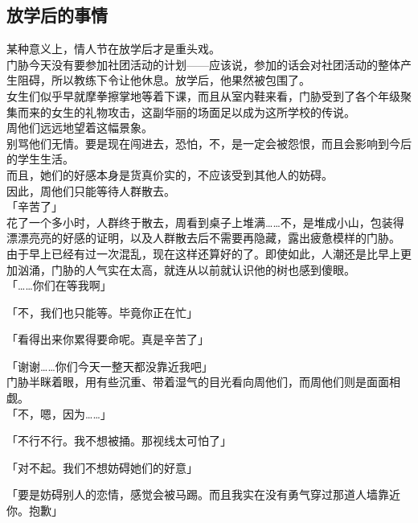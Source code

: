 \subsection{放学后的事情}

某种意义上，情人节在放学后才是重头戏。\\

门胁今天没有要参加社团活动的计划——应该说，参加的话会对社团活动的整体产生阻碍，所以教练下令让他休息。放学后，他果然被包围了。\\

女生们似乎早就摩拳擦掌地等着下课，而且从室内鞋来看，门胁受到了各个年级聚集而来的女生的礼物攻击，这副华丽的场面足以成为这所学校的传说。\\

周他们远远地望着这幅景象。\\

别骂他们无情。要是现在闯进去，恐怕，不，是一定会被怨恨，而且会影响到今后的学生生活。\\

而且，她们的好感本身是货真价实的，不应该受到其他人的妨碍。\\

因此，周他们只能等待人群散去。\\

「辛苦了」\\

花了一个多小时，人群终于散去，周看到桌子上堆满……不，是堆成小山，包装得漂漂亮亮的好感的证明，以及人群散去后不需要再隐藏，露出疲惫模样的门胁。\\

由于早上已经有过一次混乱，现在这样还算好的了。即使如此，人潮还是比早上更加汹涌，门胁的人气实在太高，就连从以前就认识他的树也感到傻眼。\\

「……你们在等我啊」

「不，我们也只能等。毕竟你正在忙」

「看得出来你累得要命呢。真是辛苦了」

「谢谢……你们今天一整天都没靠近我吧」\\

门胁半眯着眼，用有些沉重、带着湿气的目光看向周他们，而周他们则是面面相觑。\\

「不，嗯，因为……」

「不行不行。我不想被捅。那视线太可怕了」

「对不起。我们不想妨碍她们的好意」

「要是妨碍别人的恋情，感觉会被马踢。而且我实在没有勇气穿过那道人墙靠近你。抱歉」

